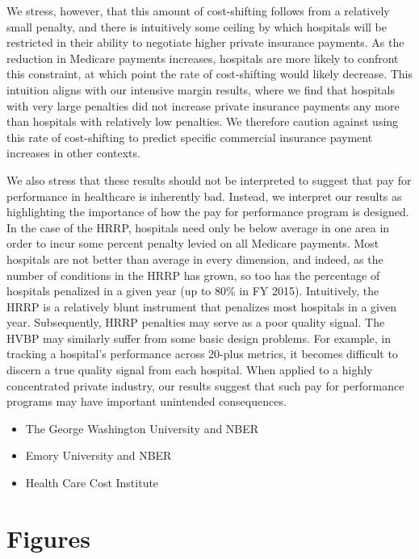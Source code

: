 \documentclass[12pt]{article}
\begin{document}
We stress, however, that this amount of cost-shifting follows from a relatively small penalty, and there is intuitively some ceiling by which hospitals will be restricted in their ability to negotiate higher private insurance payments. As the reduction in Medicare payments increases, hospitals are more likely to confront this constraint, at which point the rate of cost-shifting would likely decrease. This intuition aligns with our intensive margin results, where we find that hospitals with very large penalties did not increase private insurance payments any more than hospitals with relatively low penalties. We therefore caution against using this rate of cost-shifting to predict specific commercial insurance payment increases in other contexts.

We also stress that these results should not be interpreted to suggest that pay for performance in healthcare is inherently bad. Instead, we interpret our results as highlighting the importance of how the pay for performance program is designed. In the case of the HRRP, hospitals need only be below average in one area in order to incur some percent penalty levied on all Medicare payments. Most hospitals are not better than average in every dimension, and indeed, as the number of conditions in the HRRP has grown, so too has the percentage of hospitals penalized in a given year (up to 80\% in FY 2015). Intuitively, the HRRP is a relatively blunt instrument that penalizes most hospitals in a given year. Subsequently, HRRP penalties may serve as a poor quality signal. The HVBP may similarly suffer from some basic design problems. For example, in tracking a hospital's performance across 20-plus metrics, it becomes difficult to discern a true quality signal from each hospital. When applied to a highly concentrated private industry, our results suggest that such pay for performance programs may have important unintended consequences.

\begin{itemize}
\item[] The George Washington University and NBER
\item[] Emory University and NBER
\item[] Health Care Cost Institute
\end{itemize}

\newpage




\clearpage
\newpage


\newsavebox{\gfxbox}
\newpage
\section*{Figures}
\end{document}
